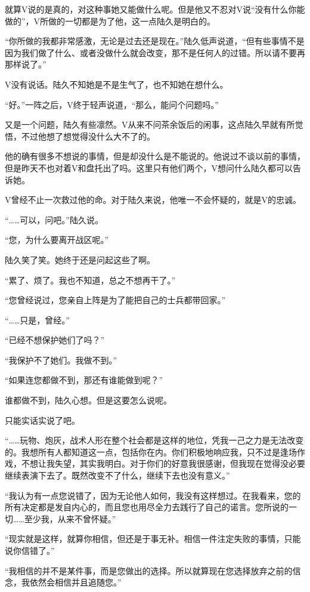 就算V说的是真的，对这种事她又能做什么呢。但是他又不忍对V说“没有什么你能做的”，V所做的一切都是为了他，这一点陆久是明白的。

“你所做的我都非常感激，无论是过去还是现在。”陆久低声说道，“但有些事情不是因为我们做了什么、或者没做什么就会改变，那不是任何人的过错。所以请不要再那样说了。”

V没有说话。陆久不知她是不是生气了，也不知她在想什么。

“好。”一阵之后，V终于轻声说道，“那么，能问个问题吗。”

又是一个问题，陆久有些凛然。V从来不问茶余饭后的闲事，这点陆久早就有所觉悟，不过他想了想觉得没什么大不了的。

他的确有很多不想说的事情，但是却没什么是不能说的。他说过不谈以前的事情，但是昨天不也对着V和盘托出了吗。这里只有他们两个，V想问什么陆久都可以告诉她。

V曾经不止一次救过他的命。对于陆久来说，他唯一不会怀疑的，就是V的忠诚。

“……可以，问吧。”陆久说。

“您，为什么要离开战区呢。”

陆久笑了笑。她终于还是问起这些了啊。

“累了、烦了。我也不知道，总之不想再干了。”

“您曾经说过，您亲自上阵是为了能把自己的士兵都带回家。”

“……只是，曾经。”

“已经不想保护她们了吗？”

“我保护不了她们。我做不到。”

“如果连您都做不到，那还有谁能做到呢？”

谁都做不到，陆久心想。但是这要怎么说呢。

只能实话实说了吧。

“……玩物、炮灰，战术人形在整个社会都是这样的地位，凭我一己之力是无法改变的。我想所有人都知道这一点，包括你在内。你们积极地响应我，只不过是逢场作戏，不想让我失望，其实我明白。对于你们的好意我很感谢，但我现在觉得没必要继续表演下去了。既然改变不了什么，继续下去也没有意义。”

“我认为有一点您说错了，因为无论他人如何，我没有这样想过。在我看来，您的所有决定都是发自内心的，而且您也用尽全力去践行了自己的诺言。您所说的一切……至少我，从来不曾怀疑。”

“现实就是这样，就算你相信，但还是于事无补。相信一件注定失败的事情，只能说你信错了。”

“我相信的并不是某件事，而是您做出的选择。所以就算现在您选择放弃之前的信念，我依然会相信并且追随您。”

